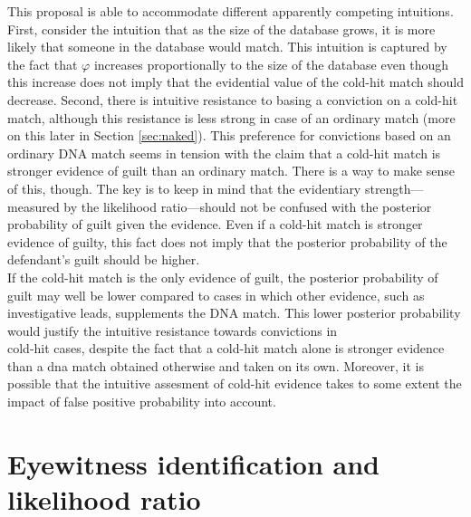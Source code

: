 \documentclass[10pt,dvipsnames,enabledeprecatedfontcommands]{scrartcl}
\begin{document}
This proposal is able to accommodate different apparently competing
intuitions. First, consider the intuition that as the size of the
database grows, it is more likely that someone in the database would
match. This intuition is captured by the fact that \(\varphi\) increases
proportionally to the size of the database even though this increase
does not imply that the evidential value of the cold-hit match should
decrease. Second, there is intuitive resistance to basing a conviction
on a cold-hit match, although this resistance is less strong in case of
an ordinary match (more on this later in Section
\ref{sec:naked}). This preference for
convictions based on an ordinary DNA match seems in tension with the
claim that a cold-hit match is stronger evidence of guilt than an
ordinary match. There is a way to make sense of this, though. The key is
to keep in mind that the evidentiary strength---measured by the
likelihood ratio---should not be confused with the posterior probability
of guilt given the evidence. Even if a cold-hit match is stronger
evidence of guilty, this fact does not imply that the posterior
probability of the defendant's guilt should be higher.\\
If the cold-hit match is the only evidence of guilt, the posterior
probability of guilt may well be lower compared to cases in which other
evidence, such as investigative leads, supplements the DNA match. This
lower posterior probability would justify the intuitive resistance
towards convictions in\\
cold-hit cases, despite the fact that a cold-hit match alone is stronger
evidence than a dna match obtained otherwise and taken on its own.
Moreover, it is possible that the intuitive assesment of cold-hit
evidence takes to some extent the impact of false positive probability
into account.


\section{\texorpdfstring{Eyewitness identification and likelihood ratio
\label{sec:eyewitness}}{Eyewitness identification and likelihood ratio }}\label{eyewitness-identification-and-likelihood-ratio}
\end{document}
